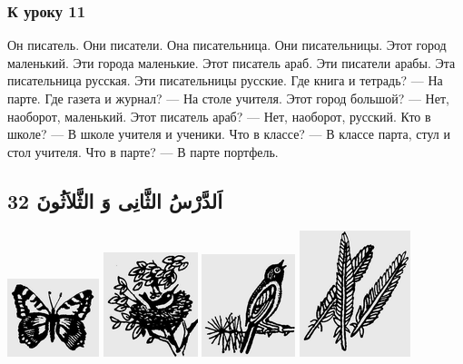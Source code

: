 \documentclass[a5paper]{article}
\begin{document}
\subsubsection{К уроку 11}
Он писатель. Они писатели. Она писательница. Они писательницы. Этот город маленький. Эти города маленькие. Этот писатель араб. Эти писатели арабы. Эта писательница русская. Эти писательницы русские. Где книга и тетрадь? — На парте. Где газета и журнал? — На столе учителя. Этот город большой? — Нет, наоборот, маленький. Этот писатель араб? — Нет, наоборот, русский. Кто в школе? — В школе учителя и ученики. Что в классе? — В классе парта, стул и стол учителя. Что в парте? — В парте портфель.

\subsection[اَلدَّرْسُ الثَّانِى وَ الثَّلاَثُونَ 32]{اَلدَّرْسُ الثَّانِى وَ الثَّلاَثُونَ 32}
 \includegraphics[width=1.052in,height=0.8957in]{images/MuhammadBagauddinprettified-img066.png}   \includegraphics[width=1.0835in,height=1.198in]{images/MuhammadBagauddinprettified-img067.png}   \includegraphics[width=1.0728in,height=1.1772in]{images/MuhammadBagauddinprettified-img068.png}   \includegraphics[width=1.2709in,height=1.448in]{images/MuhammadBagauddinprettified-img069.png} 
\end{document}
